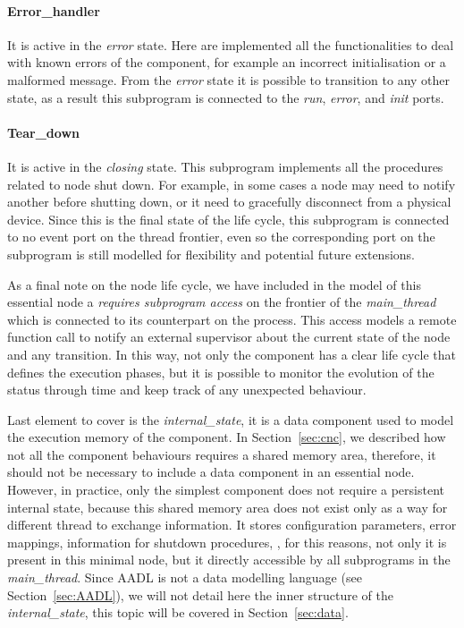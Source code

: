 \paragraph{Error\_handler} It is active in the \textit{error} state. Here are implemented all the functionalities to deal with known errors of the component, for example an incorrect initialisation or a malformed message. From the \textit{error} state it is possible to transition to any other state, as a result this subprogram is connected to the \textit{run}, \textit{error}, and \textit{init} ports.
\paragraph{Tear\_down} It is active in the \textit{closing} state. This subprogram implements all the procedures related to node shut down. For example, in some cases a node may need to notify another before shutting down, or it need to gracefully disconnect from a physical device. Since this is the final state of the life cycle, this subprogram is connected to no event port on the thread frontier, even so the corresponding port on the subprogram is still modelled for flexibility and potential future extensions.
\medskip

As a final note on the node life cycle, we have included in the model of this essential node a \textit{requires subprogram access} on the frontier of the \textit{main\_thread} which is connected to its counterpart on the process. This access models a remote function call to notify an external supervisor about the current state of the node and any transition. In this way, not only the component has a clear life cycle that defines the execution phases, but it is possible to monitor the evolution of the status through time and keep track of any unexpected behaviour.

Last element to cover is the \textit{internal\_state}, it is a data component used to model the execution memory of the component. In Section~\ref{sec:cnc}, we described how not all the component behaviours requires a shared memory area, therefore, it should not be necessary to include a data component in an essential node. However, in practice, only the simplest component does not require a persistent internal state, because this shared memory area does not exist only as a way for different thread to exchange information. It stores configuration parameters, error mappings, information for shutdown procedures, \etc, for this reasons, not only it is present in this minimal node, but it directly accessible by all subprograms in the \textit{main\_thread}. Since AADL is not a data modelling language (see Section~\ref{sec:AADL}), we will not detail here the inner structure of the \textit{internal\_state}, this topic will be covered in Section~\ref{sec:data}.

